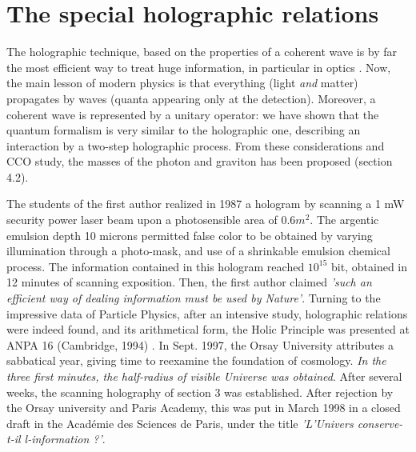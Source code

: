 \documentclass[twoside,draft]{article}
\begin{document}
\begin{sloppypar}
\section{The special holographic relations}

The holographic technique, based on the properties of a coherent wave is by far the most efficient way to treat huge information, in particular in optics \cite{Grosmann}. Now, the main lesson of modern physics is that everything (light \textit{and} matter) propagates by waves (quanta appearing only at the detection). Moreover, a coherent wave is represented by a unitary operator: we have shown that the quantum formalism is very similar to the holographic one, describing an interaction by a two-step holographic process. From these considerations and CCO study, the masses of the photon and graviton has been proposed (section 4.2).

The students of the first author realized in 1987 a hologram by scanning a 1 mW security power laser beam upon a photosensible area of $0.6 m^2$. The argentic emulsion depth 10 microns permitted false color to be obtained by varying illumination through a photo-mask, and use of a shrinkable emulsion chemical process. The information contained in this hologram reached $10^{15}$ bit, obtained in 12 minutes of scanning exposition. Then, the first author claimed \textit{'such an efficient way of dealing information must be used by Nature'}. Turning to the impressive data of Particle Physics, after an intensive study, holographic relations were indeed found, and its arithmetical form, the Holic Principle was presented at ANPA 16 (Cambridge, 1994) \cite{Sanchez4}. In Sept. 1997, the Orsay University attributes a sabbatical year, giving time to reexamine the foundation of cosmology. \textit{In the three first minutes, the half-radius of visible Universe was obtained}. After several weeks, the scanning holography of section 3 was established. After rejection by the Orsay university and Paris Academy, this was put in March 1998 in a closed draft in the Acad\'{e}mie des Sciences de Paris, under the title \textit{ 'L'Univers conserve-t-il l-information ?'}.


\end{sloppypar}
\end{document}
